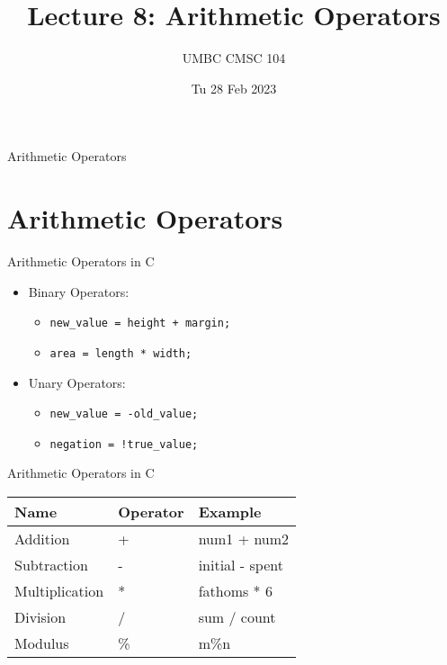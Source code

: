 \documentclass[graphics]{beamer}
\title{Lecture 8: Arithmetic Operators}
\author{UMBC CMSC 104}
\date{Tu 28 Feb 2023}
\begin{document}
\begin{frame}{}
\centering
    Arithmetic Operators
\end{frame}

\frame{\tableofcontents}

\section{Arithmetic Operators}\label{sec:athricop}
\begin{frame}{Arithmetic Operators in C}
    \begin{itemize}
        \item Binary Operators:
        \begin{itemize}
            \item \texttt{new\_value = height + margin;}
            \item \texttt{area = length * width;}
        \end{itemize}
        \item Unary Operators:
        \begin{itemize}
            \item \texttt{new\_value = -old\_value;}
            \item \texttt{negation = !true\_value;}
        \end{itemize}
    \end{itemize}
\end{frame}

\begin{frame}{Arithmetic Operators in C}
    \begin{tabular}{l l l}
        Name & Operator & Example  \\ \hline
        Addition & + & num1 + num2 \\
        Subtraction & - & initial - spent \\
        Multiplication & * & fathoms * 6 \\
        Division & / & sum / count \\
        Modulus & \% & m\%n
    \end{tabular}
\end{frame}
\end{document}
